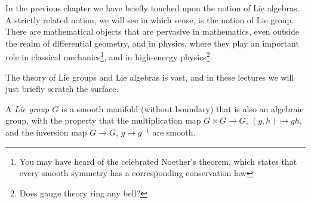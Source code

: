 In the previous chapter we have briefly touched upon the notion of Lie algebras.
A strictly related notion, we will see in which sense, is the notion of Lie group.
There are mathematical objects that are pervasive in mathematics, even outside the realm of differential geometry, and in physics, where they play an important role in classical mechanics\footnote{You may have heard of the celebrated Noether's theorem, which states that every smooth symmetry has a corresponding conservation law}, and in high-energy physics\footnote{Does gauge theory ring any bell?}.

The theory of Lie groups and Lie algebras is vast, and in these lectures we will just briefly scratch the surface.

\begin{definition}
  A \emph{Lie group $G$} is a smooth manifold (without boundary) that is also an algebraic group, with the property that the multiplication map $G\times G \to G$, $(g,h)\mapsto gh$, and the inversion map $G\to G$, $g\mapsto g^{-1}$ are smooth.
\end{definition}

